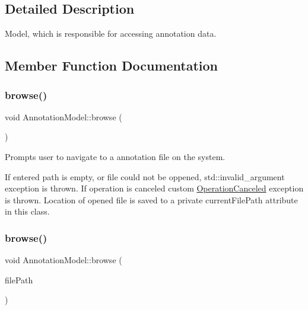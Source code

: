 \subsection{Detailed Description}
Model, which is responsible for accessing annotation data. 

\subsection{Member Function Documentation}
\mbox{\label{classAnnotationModel_aa43f69c5431ede4dc744ae9b61b49f6c}} 
\subsubsection{\texorpdfstring{browse()}{browse()}\hspace{0.1cm}{\footnotesize\ttfamily [1/2]}}
{\footnotesize\ttfamily void Annotation\+Model\+::browse (\begin{DoxyParamCaption}{ }\end{DoxyParamCaption})}



Prompts user to navigate to a annotation file on the system. 

If entered path is empty, or file could not be oppened, std\+::invalid\+\_\+argument exception is thrown. If operation is canceled custom \hyperlink{classOperationCanceled}{Operation\+Canceled} exception is thrown. Location of opened file is saved to a private current\+File\+Path attribute in this class. \mbox{\label{classAnnotationModel_a54f9ffa4151a1bdcaa1d5ab3dee87679}} 
\subsubsection{\texorpdfstring{browse()}{browse()}\hspace{0.1cm}{\footnotesize\ttfamily [2/2]}}
{\footnotesize\ttfamily void Annotation\+Model\+::browse (\begin{DoxyParamCaption}\item[{const Q\+String \&}]{file\+Path }\end{DoxyParamCaption})}



